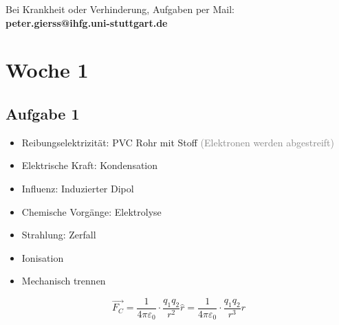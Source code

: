 \documentclass{article}
\begin{document}
\begin{center}
    Bei Krankheit oder Verhinderung, Aufgaben per Mail:\\
    \textbf{peter.gierss@ihfg.uni-stuttgart.de}
\end{center}

\section*{Woche 1}
\subsection*{Aufgabe 1}
\begin{itemize}
    \item Reibungselektrizität: PVC Rohr mit Stoff \textcolor{gray}{(Elektronen werden abgestreift)}
    \item Elektrische Kraft: Kondensation
    \item Influenz: Induzierter Dipol
    \item Chemische Vorgänge: Elektrolyse
    \item Strahlung: Zerfall
    \item Ionisation
    \item Mechanisch trennen
\end{itemize}
\begin{equation*}
    \vec{F_C} = \frac{1}{4\pi\varepsilon_0}\cdot\frac{q_1q_2}{r^2}\hat{r} =\frac{1}{4\pi\varepsilon_0}\cdot\frac{q_1q_2}{r^3}r
\end{equation*}
\end{document}
